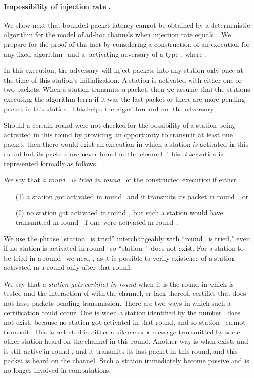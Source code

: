 \documentclass[11pt]{article}
\newcommand{\BBB}{\vspace*{-\bigskipamount}}
\newcommand{\Paragraph}[1]{\BBB\paragraph{#1}}
\begin{document}
\Paragraph{Impossibility of injection rate .}


We show next that bounded packet latency cannot be obtained by a deterministic algorithm for the model of ad-hoc channels when injection rate equals~.
We prepare for the proof of this fact by considering a construction of an execution for any fixed algorithm~ and a -activating adversary of a type , where .	



In this execution, the adversary will inject packets into any station only once at the time of this station's initialization.
A station is activated with either one or two packets.
When a station transmits a packet, then we assume that the stations executing the algorithm learn if it was the last packet or there are more pending packet in this station. 
This helps the algorithm and not the adversary.

Should a certain round were not checked for the possibility of a station being activated in this round by providing an opportunity to transmit at least one packet, then there would exist an execution in which a station \emph{is} activated in this round but its packets are never heard on the channel.
This observation is represented formally as follows.

We say that \emph{a round~ is tried in round~} of the  constructed execution if either 
\begin{enumerate}
\item[(1)] a station got activated in round~ and it transmits its packet in round~, or 

\item[(2)] no station got activated in round~, but such a station would have transmitted in round~ if one were activated in  round~.
\end{enumerate}
We use the phrase ``station~ is tried'' interchangeably with ``round~ is tried,'' even if no station is activated in round~ so ``station~'' does not exist.
For a station  to be tried in a round~ we need , as it is possible to verify existence of a station activated in a round only after that round.

We say that \emph{a station  gets certified in round } when it is the round in which  is tested and the interaction of  with the channel, or lack thereof, certifies that  does not have  packets pending transmission. 
There are two ways in which such a certification could occur. 
One is when a station identified by the number~ does not exist, because no station got activated in that round, and so station~ cannot transmit.
This is reflected in either a silence or a message transmitted by some other station heard on the channel in this round.
Another way is when  exists and is still active in round , and it transmits its last packet in this round, and  this packet is heard on the channel.
Such a station  immediately become passive and is no longer involved in computations.
\end{document}
